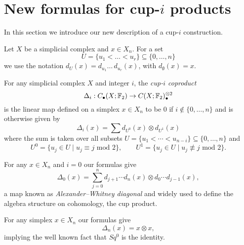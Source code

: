 
\section{New formulas for cup-\texorpdfstring{$i$}{i} products} \label{s:formulas}

In this section we introduce our new description of a cup-$i$ construction.

Let $X$ be a simplicial complex and $x \in X_n$.
For a set
\begin{equation*}
U = \{u_1 < \dots < u_r\} \subseteq \{0, \dots, n\}
\end{equation*}
we use the notation $d_U(x) = d_{u_1} \ldots\, d_{u_r}(x)$, with $d_{\emptyset}(x) = x$.

\begin{definition} \label{d:cup-i coproducts}
	For any simplicial complex $X$ and integer $i$, the \textit{cup-$i$ coproduct}
	\begin{equation*}
	\Delta_i : C_\bullet(X; {\mathbb{F}_2}) \to C(X; {\mathbb{F}_2})^{\otimes 2}_\bullet
	\end{equation*}
	is the linear map defined on a simplex $x \in X_n$ to be $0$ if $i \not\in \{0, \dots, n\}$ and is otherwise given by
	\begin{equation} \label{equation: simplicial cup-i coproducts}
	\Delta_i(x) = \sum d_{U^0}(x) \otimes d_{U^1}(x)
	\end{equation}
	where the sum is taken over all subsets $U = \{u_1 < \cdots < u_{n-i}\} \subseteq \{0, \dots, n\}$ and
	\begin{equation} \label{e:partition subsets}
	U^0 = \{u_j \in U\mid u_j \equiv j \text{ mod } 2\}, \qquad
	U^1 = \{u_j \in U\mid u_j \not\equiv j \text{ mod } 2\}.
	\end{equation}
\end{definition}

\begin{example} \label{ex:alexander-whitney diagonal}
	For any $x \in X_n$ and $i = 0$ our formulas give
	\begin{equation*}
	\Delta_0(x) = \sum_{j=0}^n d_{j+1} \cdots d_{n}(x) \otimes d_{0} \cdots d_{j-1}(x),
	\end{equation*}
	a map known as \textit{Alexander--Whitney diagonal} and widely used to define the algebra structure on cohomology, the cup product.
\end{example}

\begin{example} \label{ex:Sq0 is the identity}
	For any simplex $x \in X_n$ our formulas give
	\begin{equation*}
	\Delta_n(x) = x \otimes x,
	\end{equation*}
	implying the well known fact that $Sq^0$ is the identity.
\end{example}

